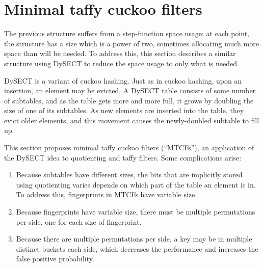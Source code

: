 \documentclass[sigconf, nonacm]{acmart}
\begin{document}


\section{Minimal taffy cuckoo filters}
\label{mtcf}

The previous structure suffers from a step-function space usage:
at each point, the structure has a size which is a power of two, sometimes allocating much more space than will be needed.
To address this, this section describes a similar structure using DySECT to reduce the space usage to only what is needed.~\cite{dysect}

DySECT is a variant of cuckoo hashing.
Just as in cuckoo hashing, upon an insertion, an element may be evicted.
A DySECT table consists of some number of subtables, and as the table gets more and more full, it grows by doubling the size of one of its subtables.
As new elements are inserted into the table, they evict older elements, and this movement causes the newly-doubled subtable to fill up.

This section proposes minimal taffy cuckoo filters (``MTCFs''), an application of the DySECT idea to quotienting and taffy filters.
Some complications arise:

\begin{enumerate}
  \item Because subtables have different sizes, the bits that are implicitly stored using quotienting varies depends on which part of the table an element is in.
    To address this, fingerprints in MTCFs have variable size.
  \item Because fingerprints have variable size, there must be multiple permutations per side, one for each size of fingerprint.
  \item Because there are multiple permutations per side, a key may be in multiple distinct buckets each side, which decreases the performance and increases the false positive probability.
\end{enumerate}
\end{document}
